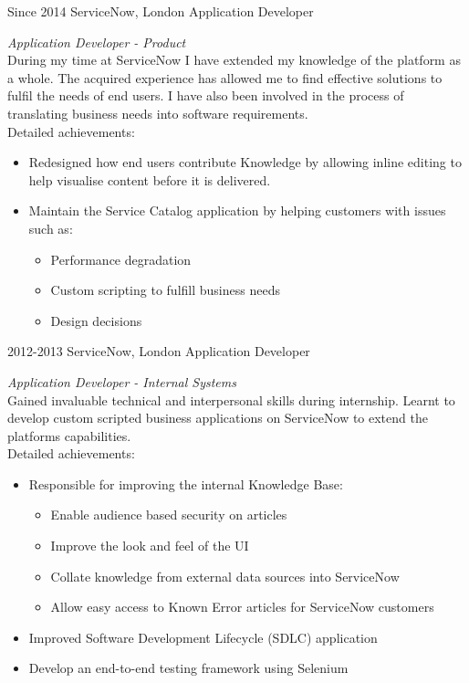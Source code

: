 \documentclass[]{friggeri-cv}
\begin{document}
\begin{entrylist}
  \entry
    {Since 2014}
    {ServiceNow, London}
    {Application Developer}
    {\emph{Application Developer - Product} \\
    During my time at ServiceNow I have extended my knowledge of the platform as a whole. The acquired experience has allowed me to find effective solutions to fulfil the needs of end users. I have also been involved in the process of translating business needs into software requirements. \\
    Detailed achievements: 
    \begin{itemize}
    
        \item {Redesigned how end users contribute Knowledge by allowing inline editing to help visualise content before it is delivered.}
        \item {Maintain the Service Catalog application by helping customers with issues such as:}
        \begin{itemize}
            \item {Performance degradation}
            \item {Custom scripting to fulfill business needs}
            \item {Design decisions}
        \end{itemize}
    \end{itemize}
    }
  \entry
    {2012-2013}
    {ServiceNow, London}
    {Application Developer}
    {\emph{Application Developer - Internal Systems} \\
    Gained invaluable technical and interpersonal skills during internship. Learnt to develop custom scripted business applications on ServiceNow to extend the platforms capabilities. \\
    Detailed achievements:
    \begin{itemize}
        \item {Responsible for improving the internal Knowledge Base:}
             \begin{itemize}
                \item {Enable audience based security on articles}
                \item {Improve the look and feel of the UI}
                \item {Collate knowledge from external data sources into ServiceNow}
                \item {Allow easy access to Known Error articles for ServiceNow customers}
            \end{itemize}
        \item {Improved Software Development Lifecycle (SDLC) application}
        \item {Develop an end-to-end testing framework using Selenium}
    \end{itemize}
    }
\end{entrylist}
\end{document}
